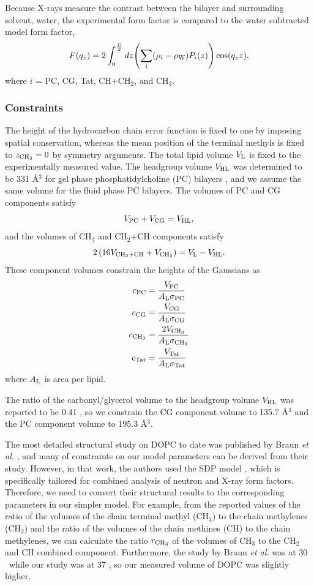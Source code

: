 Because X-rays measure the contrast between the bilayer and surrounding solvent, 
water, the experimental form factor is compared to the water subtracted model
form factor,
\begin{equation}
  F(q_z) = 2\int_0^{\frac{D}{2}} \mathop{dz} \mathopen{}\left( 
    \sum_i(\rho_i-\rho_\textrm{W})P_i(z)
   \right)\mathclose{} \cos(q_zz),
\end{equation}
where $i$ = PC, CG, Tat, CH+CH$_2$, and CH$_3$.

\subsubsection{Constraints}
The height of the hydrocarbon chain error function is fixed to one by imposing
spatial conservation, whereas the mean position of the terminal methyls is
fixed to $z_{\textrm{CH}_3}=0$ by symmetry arguments. The total lipid volume
$V_\textrm{L}$ is fixed to the experimentally measured value. 
The headgroup volume $V_\textrm{HL}$ was determined to be 331 \AA$^3$ for 
gel phase phosphatidylcholine (PC) bilayers \cite{Tristram-Nagle02},
and we assume the same volume for the fluid phase PC bilayers.
The volumes of PC and CG components satisfy
\begin{equation}
  V_\textrm{PC} + V_\textrm{CG} = V_\textrm{HL},
\end{equation}
and the volumes of CH$_3$ and CH$_2$+CH components satisfy
\begin{equation}
  2\left(16V_{\textrm{CH}_2+\textrm{CH}} + V_{\textrm{CH}_3}\right) = V_\textrm{L}-V_\textrm{HL}.
\end{equation}
These component volumes constrain the heights of the Gaussians as
\begin{align}
  c_\textrm{PC} &= \frac{V_\textrm{PC}}{A_\textrm{L}\sigma_\textrm{PC}} \\
  c_\textrm{CG} &= \frac{V_\textrm{CG}}{A_\textrm{L}\sigma_\textrm{CG}} \\
  c_{\textrm{CH}_3} &= \frac{2V_{\textrm{CH}_3}}{A_\textrm{L}\sigma_{\textrm{CH}_3}} \\
  c_\textrm{Tat} &= \frac{V_\textrm{Tat}}{A_\textrm{L}\sigma_\textrm{Tat}}
\end{align}
where $A_\textrm{L}$ is area per lipid.

The ratio of 
the carbonyl/glycerol volume to the headgroup volume $V_\textrm{HL}$ was
reported to be 0.41 \cite{Braun13}, so we constrain the CG
component volume to 135.7 \AA$^3$ and the PC component volume to 
195.3 \AA$^3$. 

The most detailed structural study on DOPC to date was published 
by Braun \textit{et al.} \cite{Braun13}, 
and many of constraints on our model parameters can be derived
from their study. However, in that work, the authors used the 
SDP model \cite{Kucerka08}, which is specifically tailored for
combined analysis of neutron and X-ray form factors. 
Therefore, we need to convert their structural results to the 
corresponding parameters in our simpler model. For example, 
from the reported values of the ratio of the volumes of the chain terminal
methyl (CH$_3$) to the chain methylenes (CH$_2$) and the ratio of 
the volumes of the chain methines (CH) to the chain methylenes, we can
calculate the ratio $r_{\textrm{CH}_3}$ of the volumes of CH$_3$ to the CH$_2$ and
CH combined component.  
Furthermore, the study by Braun \textit{et al.} was at 30 \textcelsius\
while our study was at 37 \textcelsius, so our
measured volume of DOPC was slightly higher.

